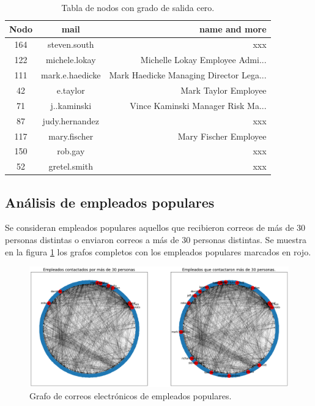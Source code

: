 \documentclass{article}
\begin{document}

\begin{table}[htb]
    \centering
    \begin{tabular}{|c|c|r|}
        \hline
        \textbf{Nodo} & \textbf{mail} & \textbf{name and more} \\
        \hline
        164 & steven.south & xxx \\
        122 & michele.lokay & Michelle Lokay Employee Admi... \\
        111 & mark.e.haedicke & Mark Haedicke Managing Director Lega... \\
        42 & e.taylor & Mark Taylor Employee \\
        71 & j..kaminski & Vince Kaminski Manager Risk Ma... \\
        87 & judy.hernandez & xxx \\
        117 & mary.fischer & Mary Fischer Employee \\
        150 & rob.gay & xxx \\
        52 & gretel.smith & xxx \\
        \hline
    \end{tabular}
    \caption{Tabla de nodos con grado de salida cero.}
    \label{tab:out_zero}
\end{table}


\subsection{Análisis de empleados populares}
Se consideran empleados populares aquellos que recibieron correos de más de 30 personas distintas o enviaron correos a más de 30 personas distintas. Se muestra en la figura \ref{fig:grafos_populares} los grafos completos con los empleados populares marcados en rojo.

\begin{figure}[htb]
    \centering
    \includegraphics[width=0.8\linewidth]{imagenes/ej1/empleados_populares.png}
    \caption{Grafo de correos electrónicos de empleados populares.}
    \label{fig:grafos_populares}
\end{figure}
\end{document}
